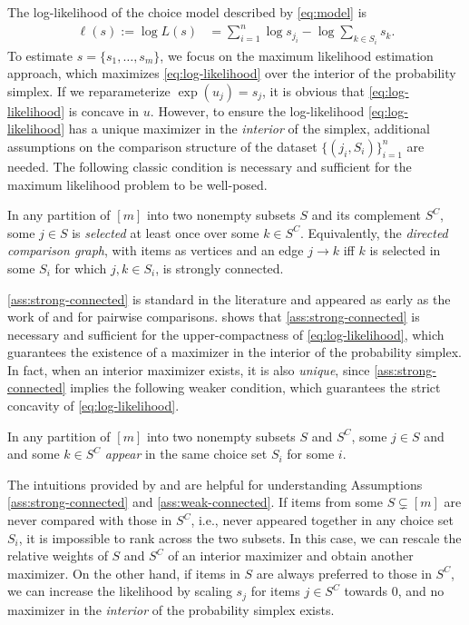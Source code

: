 The log-likelihood of the choice model described by \eqref{eq:model} is 
\begin{align}
\label{eq:log-likelihood}
\ell(s):=\log L(s) & =\sum_{i=1}^{n}\log s_{j_i}-\log\sum_{k\in S_{i}}s_{k}.
\end{align}
To estimate $s = \{s_{1},\dots,s_m\}$, we focus on the maximum likelihood estimation approach, which maximizes \eqref{eq:log-likelihood} over the interior of the probability simplex. If we reparameterize $\exp(u_{j})=s_{j}$, it is obvious that \eqref{eq:log-likelihood} is concave in $u$. However, to ensure the log-likelihood  \eqref{eq:log-likelihood} has a unique maximizer in the \emph{interior} of the simplex, additional assumptions on the comparison structure of the dataset $\{(j_i,S_i)\}_{i=1}^n$ are needed. 
The following classic condition is necessary and sufficient for the maximum likelihood problem to be well-posed.
\begin{assumption}
\label{ass:strong-connected}
In any partition of $[m]$ into two nonempty subsets $S$ and its complement $S^C$,
some $j \in S$ is \emph{selected} at least once over some
$k \in S^C$. Equivalently, the {\it directed comparison graph}, with items as vertices and an edge $j\rightarrow k$ iff $k$ is selected in some $S_i$ for which $j,k\in S_i$, is strongly connected. 
\end{assumption}
\cref{ass:strong-connected} is standard in the literature \citep{hunter2004mm,noothigattu2020axioms} and appeared as early as the work of \citet{zermelo1929berechnung} and \citet{ford1957solution} for pairwise comparisons. \citet{hunter2004mm} shows that \cref{ass:strong-connected} is necessary and sufficient for the upper-compactness
of \eqref{eq:log-likelihood}, which guarantees the existence of a maximizer in the interior of the probability simplex. In fact, when an interior maximizer exists, it is also \emph{unique}, since \cref{ass:strong-connected} implies the following weaker condition, which guarantees the strict concavity of \eqref{eq:log-likelihood}.
\begin{assumption}
\label{ass:weak-connected}
In any partition of $[m]$ into two nonempty subsets $S$ and $S^C$,
some $j\in S$ and and some $k\in S^C$ \emph{appear} in the same choice set $S_i$ for some $i$. 
\end{assumption}
The intuitions provided by \citet{ford1957solution} and \citet{hunter2004mm} are helpful for understanding Assumptions \ref{ass:strong-connected} and \ref{ass:weak-connected}. If items from some $S\subsetneq [m]$ are never compared with those in $S^C$, i.e., never appeared together in any choice set $S_i$, it is impossible to rank across the two subsets. In this case, we can rescale the relative weights of $S$ and $S^C$ of an interior maximizer and obtain another maximizer. On the other hand, if items in $S$ are always preferred to those in $S^C$, we can increase the likelihood by scaling $s_j$ for items $j\in S^C$ towards $0$, and no maximizer in the \emph{interior} of the probability simplex exists. 
